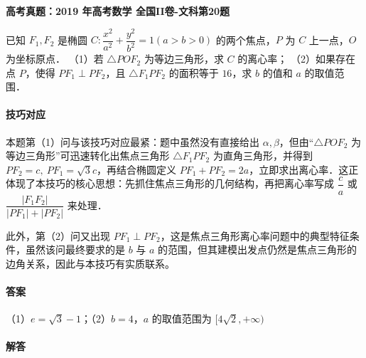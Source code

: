 \documentclass[UTF8,a4paper,11pt]{ctexart}
\newenvironment{gaokao}[1]{\par\medskip\noindent\textbf{高考真题：#1}\par\smallskip}{\par\medskip}
\begin{document}
\begin{gaokao}{2019 年高考数学 全国II卷-文科第20题}

已知 $F_1,F_2$ 是椭圆 $C:\dfrac{x^2}{a^2}+\dfrac{y^2}{b^2}=1(a>b>0)$ 的两个焦点，$P$ 为 $C$ 上一点，$O$ 为坐标原点．
（1）若 $\triangle POF_2$ 为等边三角形，求 $C$ 的离心率；
（2）如果存在点 $P$，使得 $PF_1\perp PF_2$，且 $\triangle F_1PF_2$ 的面积等于 $16$，求 $b$ 的值和 $a$ 的取值范围．

\begin{center}


\end{center}

\paragraph{技巧对应}

本题第（1）问与该技巧对应最紧：题中虽然没有直接给出 $\alpha,\beta$，但由“$\triangle POF_2$ 为等边三角形”可迅速转化出焦点三角形 $\triangle F_1PF_2$ 为直角三角形，并得到 $PF_2=c,\ PF_1=\sqrt3 c$，再结合椭圆定义 $PF_1+PF_2=2a$，立即求出离心率．这正体现了本技巧的核心思想：先抓住焦点三角形的几何结构，再把离心率写成 $\dfrac{c}{a}$ 或 $\dfrac{|F_1F_2|}{|PF_1|+|PF_2|}$ 来处理．

此外，第（2）问又出现 $PF_1\perp PF_2$，这是焦点三角形离心率问题中的典型特征条件，虽然该问最终要求的是 $b$ 与 $a$ 的范围，但其建模出发点仍然是焦点三角形的边角关系，因此与本技巧有实质联系。

\paragraph{答案}

（1）$e=\sqrt{3}-1$；（2）$b=4$，$a$ 的取值范围为 $[4\sqrt{2},+\infty)$

\paragraph{解答}


\end{gaokao}
\end{document}
